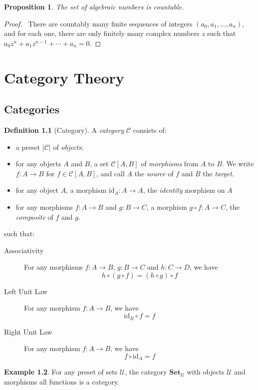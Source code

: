 \documentclass{book}
\let\qed\relax
\newtheorem{prop}{Proposition}[chapter]
\theoremstyle{definition}
\newtheorem{df}[prop]{Definition}
\newtheorem{ex}[prop]{Example}
\newcommand{\id}[1]{\ensuremath{\mathrm{id}_{#1}}}
\begin{document}
\begin{prop}
The set of algebraic numbers is countable.
\end{prop}

\begin{proof}
\pf\ There are countably many finite sequences of integers $(a_0, a_1, \ldots, a_n)$, and for each one, there are only finitely many complex numbers $z$ such that $a_0 z^n + a_1 z^{n-1} + \cdots + a_n = 0$. \qed
\end{proof}

\part{Category Theory}

\chapter{Categories}

\begin{df}[Category]
A \emph{category} $\mathcal{C}$ consists of:
\begin{itemize}
\item a preset $|\mathcal{C}|$ of \emph{objects};
\item for any objects $A$ and $B$, a set $\mathcal{C}[A,B]$ of \emph{morphisms} from $A$ to $B$. We write $f : A \rightarrow B$ for $f \in \mathcal{C}[A,B]$, and call $A$ the \emph{source} of $f$ and $B$ the \emph{target}.
\item for any object $A$, a morphism $\id{A} : A \rightarrow A$, the \emph{identity} morphism on $A$
\item for any morphisms $f : A \rightarrow B$ and $g : B \rightarrow C$, a morphism $g \circ f : A \rightarrow C$, the \emph{composite} of $f$ and $g$.
\end{itemize}
such that:
\begin{description}
\item[Associativity] For any morphisms $f : A \rightarrow B$, $g : B \rightarrow C$ and $h : C \rightarrow D$, we have
\[ h \circ (g \circ f) = (h \circ g) \circ f \]
\item[Left Unit Law]
For any morphism $f : A \rightarrow B$, we have
\[ \id{B} \circ f = f \]
\item[Right Unit Law]
For any morphism $f : A \rightarrow B$, we have
\[ f \circ \id{A} = f \]
\end{description}
\end{df}

\begin{ex}
For any preset of sets $\mathcal{U}$, the category $\mathbf{Set}_\mathcal{U}$ with objects $\mathcal{U}$ and morphisms all functions is a category.
\end{ex}
\end{document}
